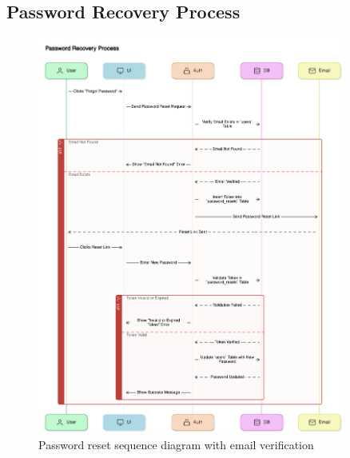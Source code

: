 \subsection{Password Recovery Process}
\begin{figure}[H]
    \centering
    \includegraphics[width=0.9\textwidth]{latex-doc/images/sequence_diagrams/password_recovery_process.png}
    \caption{Password reset sequence diagram with email verification}
    \label{fig:password_recovery}
\end{figure}

